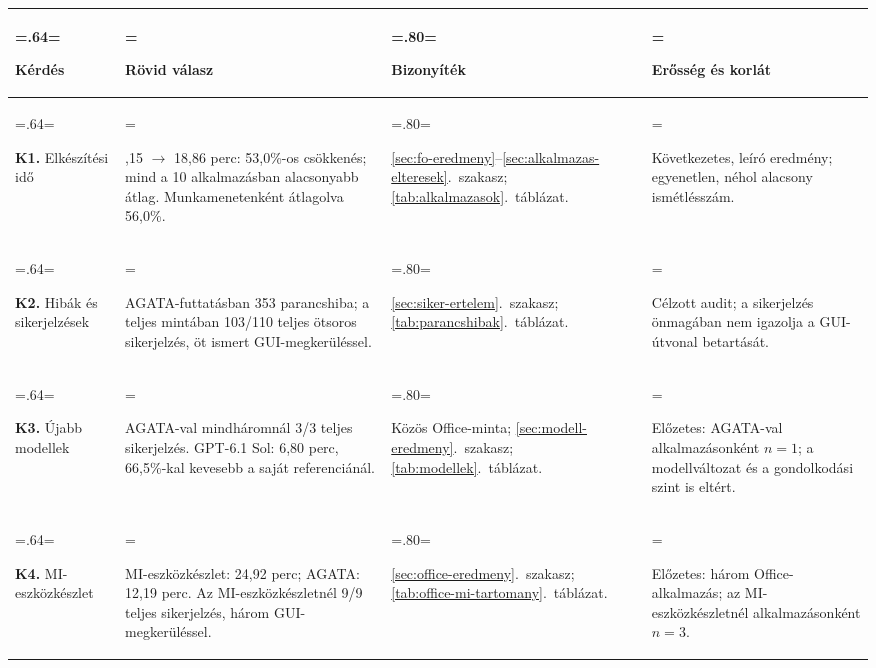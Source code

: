 \setlength{\tabcolsep}{4pt}
\renewcommand{\arraystretch}{1.08}
\begin{tabularx}{\textwidth}{@{}
>{\hsize=.64\hsize\linewidth=\hsize\raggedright\arraybackslash}X
>{\hsize=1.40\hsize\linewidth=\hsize\raggedright\arraybackslash}X
>{\hsize=.80\hsize\linewidth=\hsize\raggedright\arraybackslash}X
>{\hsize=1.16\hsize\linewidth=\hsize\raggedright\arraybackslash}X@{}}
\toprule
\textbf{Kérdés} & \textbf{Rövid válasz} & \textbf{Bizonyíték} &
\textbf{Erősség és korlát} \\
\midrule
\textbf{K1.} Elkészítési idő &
40,15 $\to$ 18,86 perc: 53,0\%-os csökkenés; mind a 10 alkalmazásban
alacsonyabb átlag. Munkamenetenként átlagolva 56,0\%. &
\ref{sec:fo-eredmeny}--\ref{sec:alkalmazas-elteresek}.~szakasz;
\ref{tab:alkalmazasok}.~táblázat. &
Következetes, leíró eredmény; egyenetlen, néhol alacsony ismétlésszám. \\
\addlinespace[.5em]
\textbf{K2.} Hibák és sikerjelzések &
39 AGATA-futtatásban 353 parancshiba; a teljes mintában
103/110 teljes ötsoros sikerjelzés, öt ismert GUI-megkerüléssel. &
\ref{sec:siker-ertelem}.~szakasz;
\ref{tab:parancshibak}.~táblázat. &
Célzott audit; a sikerjelzés önmagában nem igazolja a GUI-útvonal betartását. \\
\addlinespace[.5em]
\textbf{K3.} Újabb modellek &
AGATA-val mindháromnál 3/3 teljes sikerjelzés.
GPT-6.1 Sol: 6,80 perc, 66,5\%-kal kevesebb a saját referenciánál. &
Közös Office-minta;
\ref{sec:modell-eredmeny}.~szakasz;
\ref{tab:modellek}.~táblázat. &
Előzetes: AGATA-val alkalmazásonként $n=1$;
a modellváltozat és a gondolkodási szint is eltért. \\
\addlinespace[.5em]
\textbf{K4.} MI-eszköz\-készlet &
MI-eszközkészlet: 24,92 perc; AGATA: 12,19 perc.
Az MI-eszközkészletnél 9/9 teljes sikerjelzés, három GUI-megkerüléssel. &
\ref{sec:office-eredmeny}.~szakasz;
\ref{tab:office-mi-tartomany}.~táblázat. &
Előzetes: három Office-alkalmazás; az MI-eszközkészletnél
alkalmazásonként $n=3$. \\
\bottomrule
\end{tabularx}
